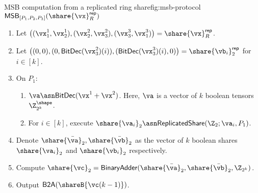 \begin{Boxfig}{MSB computation from a replicated ring share}{fig:msb-protocol}
  {$\mathsf{MSB}_{[P_1, P_2, P_3]}(\share{\vx}^\mathsf{rep}_R)$}
  \begin{enumerate}
  \item Let $\left( (\vx_1^1, \vx_2^1), (\vx_2^2, \vx_3^2), (\vx_3^3, \vx_1^3) \right) = \share{\vx}^{\mathsf{rep}}_{R}$.
  \item Let $\left( (0, 0), (0, \textsf{BitDec}(\vx_3^2)(i)), (\textsf{BitDec}(\vx_3^3)(i),0) \right) = \share{\vb_i}_2^\mathsf{rep}$ for $i \in [k]$.
  \item On $P_1$:
  \begin{enumerate}
    \item $\va \asn \textsf{BitDec}(\vx^1 + \vx^2)$. Here, $\va$ is a vector of $k$ boolean tensors $\Z_{2^k}^\shape$.
    \item For $i \in [k]$, execute $\share{\va_i}_2 \asn \mathsf{ReplicatedShare}(\Z_2; \va_i, P_1)$.
  \end{enumerate}
  \item Denote $\share{\bar{\va}}_2,
  \share{\bar{\vb}}_2$ as the vector of $k$ boolean shares
  $\share{\va_i}_2$ and $\share{\vb_i}_2$ respectively.
  \item Compute $\share{\vc}_2 = \textsf{BinaryAdder}(\share{\bar{\va}}_2, \share{\bar{\vb}}_2, \Z_{2^k})$.
  \item Output $\textsf{B2A}(\shareB{\vc(k-1)})$.
\end{enumerate}

\end{Boxfig}

